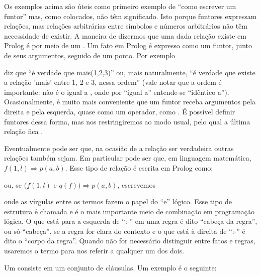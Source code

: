 Os exemplos acima são úteis como primeiro exemplo de ``como escrever um funtor'' mas, como colocados, não têm significado. Isto
porque funtores expressam relações, mas relações arbitrárias entre símbolos e números arbitrários não têm necessidade de existir.
A maneira de dizermos que uma dada relação existe em Prolog é por meio de um . Um fato em Prolog é expresso como
um funtor, junto de seus argumentos, seguido de um ponto. Por exemplo


\noindent diz que ``é verdade que mais(1,2,3)'' ou, mais naturalmente, ``é verdade que existe a relação 'mais' entre 1, 2 e 3, nessa ordem'' (vale notar que a ordem é importante:  não é o igual a , onde por ``igual a'' entende-se ``idêntico a'').
Ocasionalmente, é muito mais conveniente que um funtor receba argumentos pela direita e pela esquerda, quase como um operador,
como . É possível definir funtores dessa forma, mas nos restringiremos ao modo usual, pelo qual a última relação fica
.

Eventualmente pode ser que, na ocasião de a relação  ser verdadeira outras relações também sejam.
Em particular pode ser que, em linguagem matemática, $ f(1,l) \Rightarrow p(a,b) $. Esse tipo de relação é escrita em Prolog como:


\noindent ou, se $ (f(1,l)$ e $q(f)) \Rightarrow p(a,b) $, escrevemos


\noindent onde as vírgulas entre os termos fazem o papel do ``e'' lógico. Esse tipo de estrutura é chamada 
e é o mais importante meio de combinação em programação lógica. O que está para a esquerda de ``:-'' em uma regra é dito
``cabeça da regra'', ou só ``cabeça'', se a regra for clara do contexto e o que está à direita de ``:-'' é dito o
``corpo da regra''. Quando não for necessário distinguir entre fatos e regras, usaremos o termo  para
nos referir a qualquer um dos dois.

Um  consiste em um conjunto de cláusulas. Um exemplo é o seguinte:\\

    \begin{listing}
\inputminted{prolog}{../Exemplos/Cap0/prog1_cafe.pl}\label{lst:cafe}
    \end{listing}

